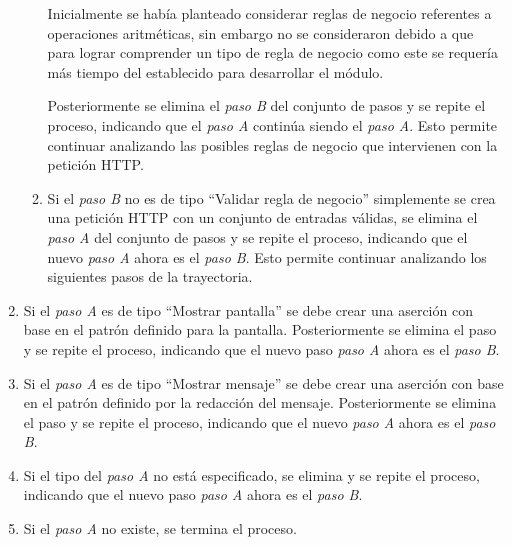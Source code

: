 \begin{enumerate}
\begin{enumerate}
			Inicialmente se había planteado considerar reglas de negocio referentes a operaciones aritméticas, sin embargo no se consideraron debido a que para lograr comprender un tipo de regla de negocio como este se requería más tiempo del establecido para desarrollar el módulo.
			
			
			Posteriormente se elimina el {\it paso B} del conjunto de pasos y se repite el proceso, indicando que el {\it paso A} continúa siendo el {\it paso A}. Esto permite continuar analizando las posibles reglas de negocio que intervienen con la petición HTTP.\\
						
			
			\item Si el {\it paso B} no es de tipo ``Validar regla de negocio'' simplemente se crea una petición HTTP con un conjunto de entradas válidas, se elimina el {\it paso A} del conjunto de pasos y se repite el proceso, indicando que el nuevo {\it paso A} ahora es el {\it paso B}. Esto permite continuar analizando los siguientes pasos de la trayectoria.
			
		\end{enumerate}
		 
			\item Si el {\it paso A} es de tipo ``Mostrar pantalla'' se debe crear una aserción con base en el patrón definido para la pantalla. Posteriormente se elimina el paso y se repite el proceso, indicando que el nuevo paso {\it paso A} ahora es el {\it paso B}.
			
			\item Si el {\it paso A} es de tipo ``Mostrar mensaje'' se debe crear una aserción con base en el patrón definido por la redacción del mensaje. Posteriormente se elimina el paso y se repite el proceso, indicando que el nuevo {\it paso A} ahora es el {\it paso B}.
			
			\item Si el tipo del {\it paso A} no está especificado, se elimina y se repite el proceso, indicando que el nuevo paso {\it paso A} ahora es el {\it paso B}.
			
			\item Si el {\it paso A} no existe, se termina el proceso.
	\end{enumerate}